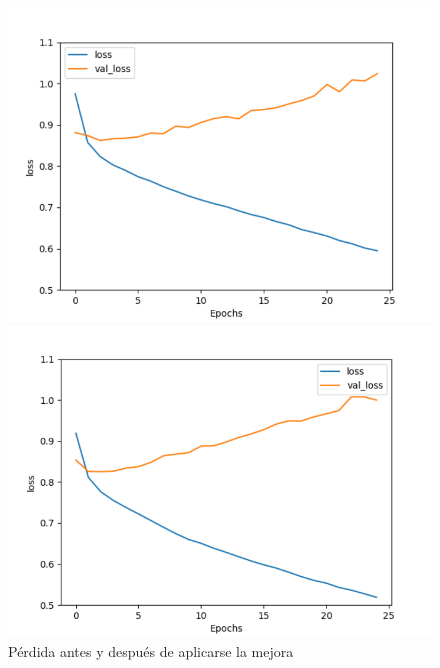 \documentclass[a4]{sciposter}
\begin{document}
\begin{multicols}{3}
\begin{figure}[!tbp]
  \centering
  \begin{minipage}[b]{0.45\textwidth}
    \includegraphics[width=1.1\textwidth]{img/Loss Before.png}
  \end{minipage}
  \begin{minipage}[b]{0.45\textwidth}
    \includegraphics[width=1.1\textwidth]{img/Loss After.png}
  \end{minipage}
  \caption{Pérdida antes y después de aplicarse la mejora}
\end{figure}




\end{multicols}
\end{document}
